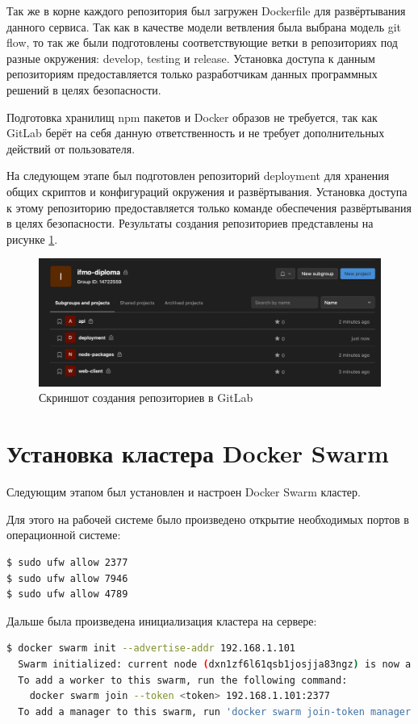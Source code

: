 Так же в корне каждого репозитория был загружен Dockerfile для развёртывания данного сервиса.
Так как в качестве модели ветвления была выбрана модель git flow, то так же были подготовлены соответствующие ветки в репозиториях под разные окружения: develop, testing и release.
Установка доступа к данным репозиториям предоставляется только разработчикам данных программных решений в целях безопасности.

Подготовка хранилищ npm пакетов и Docker образов не требуется, так как GitLab берёт на себя данную ответственность и не требует дополнительных действий от пользователя.

На следующем этапе был подготовлен репозиторий deployment для хранения общих скриптов и конфигураций окружения и развёртывания.
Установка доступа к этому репозиторию предоставляется только команде обеспечения развёртывания в целях безопасности.
Результаты создания репозиториев представлены на рисунке \ref{fig:reps-ready}.

\begin{figure}[ht]
    \centering
    \includegraphics[scale=0.4]{src/figures/reps-ready}
    \caption{Скриншот создания репозиториев в GitLab}
    \label{fig:reps-ready}
\end{figure}

\section{Установка кластера Docker Swarm}

Следующим этапом был установлен и настроен Docker Swarm кластер.

Для этого на рабочей системе было произведено открытие необходимых портов в операционной системе\cite{linuxPocket}:
\begin{lstlisting}[language=bash,caption={Открытие портов в Linux}]
$ sudo ufw allow 2377
$ sudo ufw allow 7946
$ sudo ufw allow 4789
\end{lstlisting}

Дальше была произведена инициализация кластера на сервере:
\begin{lstlisting}[language=bash,caption={Инициализация кластера}]
$ docker swarm init --advertise-addr 192.168.1.101
  Swarm initialized: current node (dxn1zf6l61qsb1josjja83ngz) is now a manager.
  To add a worker to this swarm, run the following command:
    docker swarm join --token <token> 192.168.1.101:2377
  To add a manager to this swarm, run 'docker swarm join-token manager' and follow the instructions.
\end{lstlisting}

